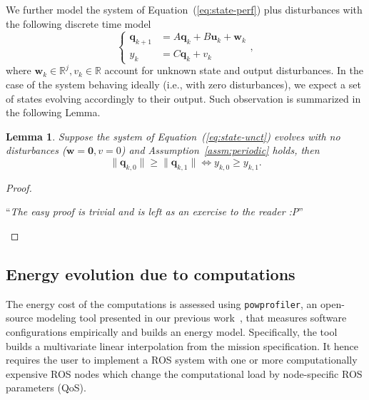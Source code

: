 \documentclass[letterpaper,10pt,conference]{ieeeconf}
\newcommand{\stt}[1]{{\small\tt #1}} %
\newcommand{\powprof}{\stt{powprofiler}}
\newtheorem{lem}[thm]{Lemma}
\begin{document}
We further model the system of Equation~(\ref{eq:state-perf}) plus disturbances with the following discrete time model
\begin{equation}\label{eq:state-unct}
  \begin{cases}
  \mathbf{q}_{k+1}&=A\mathbf{q}_{k}+B\mathbf{u}_{k}+\mathbf{w}_k\\
  y_k&=C\mathbf{q}_k+v_k
  \end{cases},
\end{equation}
where $\mathbf{w}_k\in\mathbb{R}^j,v_k\in\mathbb{R}$ account for unknown state and output disturbances. In the case of the system behaving ideally (i.e., with zero disturbances), we expect a set of states evolving accordingly to their output. Such observation is summarized in the following Lemma.

\begin{lem}\label{lem:state-vs-energy}
  Suppose the system of Equation~(\ref{eq:state-unct}) evolves with no disturbances ($\mathbf{w}=\mathbf{0},v=0$) and Assumption~\ref{assm:periodic} holds, then
  \begin{equation}
    \|\mathbf{q}_{k,0}\|\geq\|\mathbf{q}_{k,1}\|\iff y_{k,0}\geq y_{k,1}.
  \end{equation}
\end{lem}
\begin{proof}
  \begin{center}\vspace{.2cm}``\emph{The easy proof is trivial and is left as an exercise to the reader :P}''\vspace{.6cm}\end{center}
\end{proof}

\subsection{Energy evolution due to computations}
\label{sec:computations-model}

The energy cost of the computations is assessed using \powprof{}, an open-source modeling tool presented in our previous work~\cite{seewald2019coarse}, that measures software configurations empirically and builds an energy model. Specifically, the tool builds a multivariate linear interpolation from the mission specification. It hence requires the user to implement a ROS system with one or more computationally expensive ROS nodes which change the computational load by node-specific ROS parameters (QoS).
\end{document}
